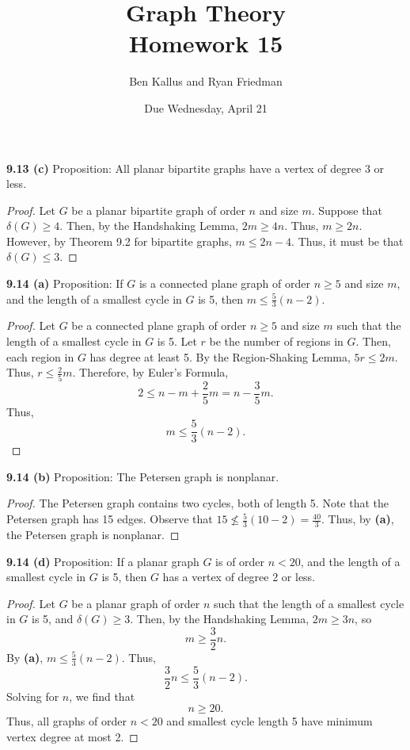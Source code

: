 \documentclass[12pt]{article}
\title{Graph Theory \\ Homework 15}
\author{Ben Kallus and Ryan Friedman}
\date{Due Wednesday, April 21}
\begin{document}
\maketitle

\medskip\noindent\textbf{9.13 (c)} Proposition: All planar bipartite graphs have a vertex of degree 3 or less.
\begin{proof}
    Let $G$ be a planar bipartite graph of order $n$ and size $m$.
    Suppose that $\delta(G) \geq 4$.
    Then, by the Handshaking Lemma, $2m \geq 4n$.
    Thus, $m \geq 2n$.
    However, by Theorem 9.2 for bipartite graphs,  $m \leq 2n - 4$.
    Thus, it must be that $\delta(G) \leq 3$.
\end{proof}

\newpage
\medskip\noindent\textbf{9.14 (a)} Proposition: If $G$ is a connected plane graph of order $n \geq 5$ and size $m$, and the length of a smallest cycle in $G$ is 5, then $m \leq \frac53\left(n - 2\right)$.
\begin{proof}
    Let $G$ be a connected plane graph of order $n \geq 5$ and size $m$ such that the length of a smallest cycle in $G$ is 5.
    Let $r$ be the number of regions in $G$.
    Then, each region in $G$ has degree at least 5.
    By the Region-Shaking Lemma, $5r \leq 2m$.
    Thus, $r \leq \frac25m$.
    Therefore, by Euler's Formula, $$2 \leq n - m + \frac25m = n - \frac35m.$$
    Thus, $$m \leq \frac53(n - 2).$$
    
\end{proof}

\medskip\noindent\textbf{9.14 (b)} Proposition: The Petersen graph is nonplanar.
\begin{proof}
    The Petersen graph contains two cycles, both of length 5.
    Note that the Petersen graph has 15 edges.
    Observe that $15 \not\leq \frac53\left(10-2\right) = \frac{40}3.$
    Thus, by \textbf{(a)}, the Petersen graph is nonplanar.
\end{proof}

\medskip\noindent\textbf{9.14 (d)} Proposition: If a planar graph $G$ is of order $n < 20$, and the length of a smallest cycle in $G$ is 5, then $G$ has a vertex of degree 2 or less.
\begin{proof}
    Let $G$ be a planar graph of order $n$ such that the length of a smallest cycle in $G$ is 5, and $\delta(G) \geq 3$.
    Then, by the Handshaking Lemma, $2m \geq 3n$, so $$m \geq \frac32n.$$
    By \textbf{(a)}, $m \leq \frac53(n-2)$.
    Thus, $$\frac32n \leq \frac53(n-2).$$
    Solving for $n$, we find that $$n \geq 20.$$
    Thus, all graphs of order $n < 20$ and smallest cycle length 5 have minimum vertex degree at most 2.
\end{proof}
\end{document}

